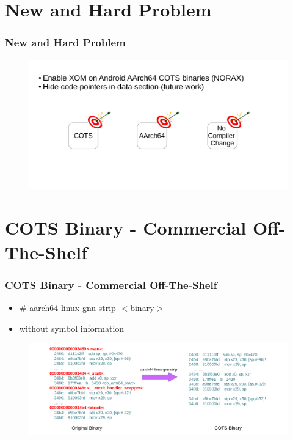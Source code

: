 \documentclass[aspectratio=169]{beamer}
\begin{document}

\section{New and Hard Problem}
\begin{frame}
\frametitle{New and Hard Problem}
\begin{figure}
\includegraphics[width=1.0\linewidth]{figures/problem.pdf}
\end{figure}
\end{frame}



\section{COTS Binary - Commercial Off-The-Shelf}
\begin{frame}
\frametitle{COTS Binary - Commercial Off-The-Shelf}
\begin{itemize}
\item $\#$ aarch64-linux-gnu-strip $<$binary$>$
\item without symbol information
\end{itemize}
\begin{figure}
\includegraphics[width=1.0\linewidth]{figures/cots.pdf}
\end{figure}
\end{frame}
\end{document}
